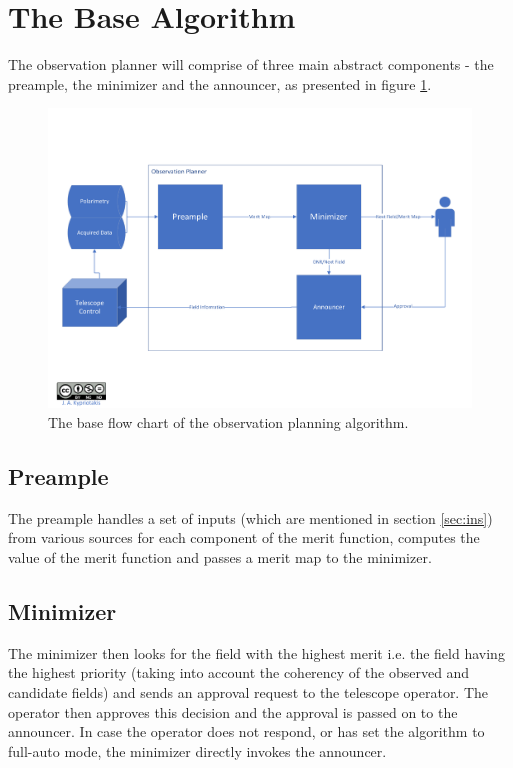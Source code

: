 \documentclass{article}
\begin{document}
\clearpage
\section{The Base Algorithm}
The observation planner will comprise of three main abstract components - the preample, the minimizer and the announcer, as presented in figure \ref{fig:baseflow}.
\begin{figure}[!ht]
\centering
\includegraphics[width=\linewidth]{Base_new.pdf}
\caption{The base flow chart of the observation planning algorithm.}
\label{fig:baseflow}
\end{figure}

\subsection{Preample}
The preample handles a set of inputs (which are mentioned in section \ref{sec:ins}) from various sources for each component of the merit function, computes the value of the merit function and passes a merit map to the minimizer.

\subsection{Minimizer}
The minimizer then looks for the field with the highest merit i.e. the field having the highest priority (taking into account the coherency of the observed and candidate fields) and sends an approval request to the telescope operator. The operator then approves this decision and the approval is passed on to the announcer. In case the operator does not respond, or has set the algorithm to full-auto mode, the minimizer directly invokes the announcer. 
\end{document}
